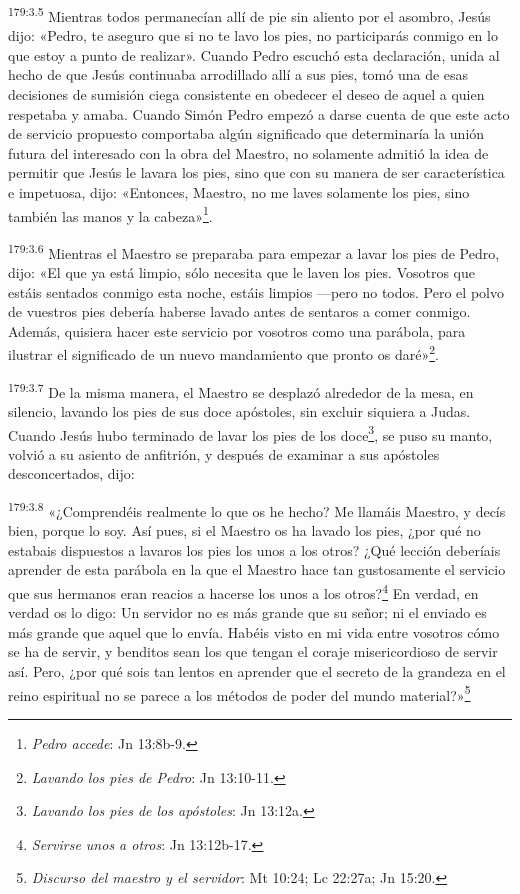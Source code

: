 \par
\textsuperscript{179:3.5} Mientras todos permanecían allí de pie sin aliento por el asombro, Jesús dijo: «Pedro, te aseguro que si no te lavo los pies, no participarás conmigo en lo que estoy a punto de realizar». Cuando Pedro escuchó esta declaración, unida al hecho de que Jesús continuaba arrodillado allí a sus pies, tomó una de esas decisiones de sumisión ciega consistente en obedecer el deseo de aquel a quien respetaba y amaba. Cuando Simón Pedro empezó a darse cuenta de que este acto de servicio propuesto comportaba algún significado que determinaría la unión futura del interesado con la obra del Maestro, no solamente admitió la idea de permitir que Jesús le lavara los pies, sino que con su manera de ser característica e impetuosa, dijo: «Entonces, Maestro, no me laves solamente los pies, sino también las manos y la cabeza»\footnote{\textit{Pedro accede}: Jn 13:8b-9.}.

\par
\textsuperscript{179:3.6} Mientras el Maestro se preparaba para empezar a lavar los pies de Pedro, dijo: «El que ya está limpio, sólo necesita que le laven los pies. Vosotros que estáis sentados conmigo esta noche, estáis limpios ---pero no todos. Pero el polvo de vuestros pies debería haberse lavado antes de sentaros a comer conmigo. Además, quisiera hacer este servicio por vosotros como una parábola, para ilustrar el significado de un nuevo mandamiento que pronto os daré»\footnote{\textit{Lavando los pies de Pedro}: Jn 13:10-11.}.

\par
\textsuperscript{179:3.7} De la misma manera, el Maestro se desplazó alrededor de la mesa, en silencio, lavando los pies de sus doce apóstoles, sin excluir siquiera a Judas. Cuando Jesús hubo terminado de lavar los pies de los doce\footnote{\textit{Lavando los pies de los apóstoles}: Jn 13:12a.}, se puso su manto, volvió a su asiento de anfitrión, y después de examinar a sus apóstoles desconcertados, dijo:

\par
\textsuperscript{179:3.8} «¿Comprendéis realmente lo que os he hecho? Me llamáis Maestro, y decís bien, porque lo soy. Así pues, si el Maestro os ha lavado los pies, ¿por qué no estabais dispuestos a lavaros los pies los unos a los otros? ¿Qué lección deberíais aprender de esta parábola en la que el Maestro hace tan gustosamente el servicio que sus hermanos eran reacios a hacerse los unos a los otros?\footnote{\textit{Servirse unos a otros}: Jn 13:12b-17.} En verdad, en verdad os lo digo: Un servidor no es más grande que su señor; ni el enviado es más grande que aquel que lo envía. Habéis visto en mi vida entre vosotros cómo se ha de servir, y benditos sean los que tengan el coraje misericordioso de servir así. Pero, ¿por qué sois tan lentos en aprender que el secreto de la grandeza en el reino espiritual no se parece a los métodos de poder del mundo material?»\footnote{\textit{Discurso del maestro y el servidor}: Mt 10:24; Lc 22:27a; Jn 15:20.}

